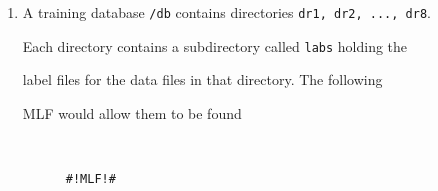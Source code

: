 \begin{enumerate}
{two.1.wav, two.2.wav, two.3.wav, ...}, etc.  Label files are required containing


just the name of the model so that \HTK\ tools such as  can be used.


If MLFs are not used, individual label files are needed.  For example,


the individual label files \texttt{one.1.lab, one.2.lab, one.3.lab, ....} would be


needed


to identifiy instances of ``one'' even though each file contains the same entry, just


\begin{verbatim}


      one


\end{verbatim}


Using an MLF containing


\begin{verbatim}


      #!MLF!#


      "*/one.*.lab"


      one


      .


      "*/two.*.lab"


      two


      .


      "*/three.*.lab"


      three


      .


      <etc.>


\end{verbatim}


avoids the need for many duplicate label files.





\item


A training database \texttt{/db} contains directories \texttt{dr1, dr2, ..., dr8}.


Each directory contains a subdirectory called \texttt{labs} holding the


label files for the data files in that directory.  The following


MLF would allow them to be found


\begin{verbatim}


      #!MLF!#



\end{verbatim}
\end{enumerate}
